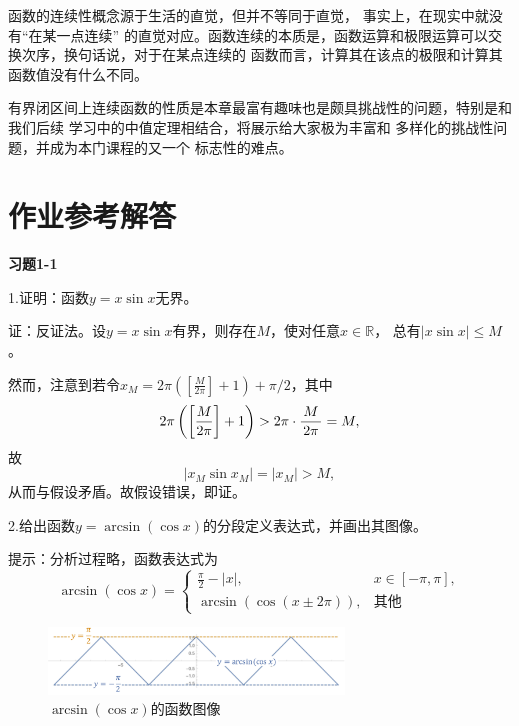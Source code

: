 函数的连续性概念源于生活的直觉，但并不等同于直觉，
事实上，在现实中就没有“在某一点连续”
的直觉对应。{\kaishu 函数连续的本质是，函数运算和极限运算可以交换次序}，换句话说，对于在某点连续的
函数而言，计算其在该点的极限和计算其函数值没有什么不同。

{\kaishu 有界闭区间上连续函数的性质}是本章最富有趣味也是颇具挑战性的问题，特别是和我们后续
学习中的中值定理相结合，将展示给大家极为丰富和
多样化的挑战性问题，并成为本门课程的又一个
标志性的难点。

\newpage

\ifanswer

\newpage
\section{作业参考解答}

\begin{center}
	\bf 习题1-1
\end{center}

1.证明：函数$y=x\sin x$无界。

证：反证法。设$y=x\sin x$有界，则存在$M$，使对任意$x\in\mathbb{R}$，
总有$|x\sin x|\leq M$。

然而，注意到若令$x_M=2\pi\left(\left[\frac{M}{2\pi}\right]+1\right)
+\pi/2$，其中
$$2\pi\left(\left[\frac{M}{2\pi}\right]+1\right)
>2\pi\cdot\displaystyle\frac{\,{M}\,}{\,{2\pi}\,}=M,$$
故
$$|x_M\sin x_M|=|x_M|>M,$$
从而与假设矛盾。故假设错误，即证。
\fin

\bs
2.给出函数$y=\arcsin(\cos x)$的分段定义表达式，并画出其图像。

提示：分析过程略，函数表达式为
$$\arcsin(\cos x)=\left\{\begin{array}{ll}
\frac{\pi}2-|x|,& x\in[-\pi,\pi],\\
\arcsin(\cos(x\pm2\pi)),& \mbox{其他}
\end{array}\right.$$

\begin{figure}[h]
	\centering
	\includegraphics[width=0.7\textwidth]{./Images/Ch01/arcsin-cos.pdf}
	\caption{$\arcsin(\cos x)$的函数图像}
	\label{fig:arcsin-cos}
\end{figure}
\fin

